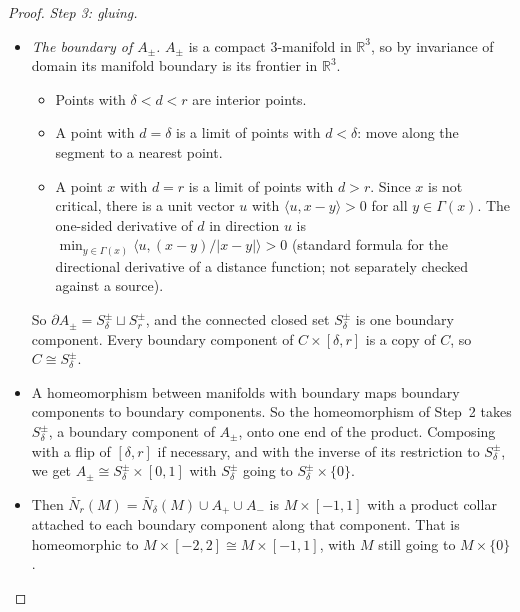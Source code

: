 \documentclass[preprint,12pt]{elsarticle}
\theoremstyle{definition}
\theoremstyle{remark}
\newcommand{\R}{\mathbb{R}}
\begin{document}
\begin{proof}
\emph{Step 3: gluing.}
\begin{itemize}
\item \emph{The boundary of $A_\pm$.} $A_\pm$ is a compact 3-manifold in $\R^3$, so by invariance of domain its manifold
boundary is its frontier in $\R^3$.
  \begin{itemize}
  \item Points with $\delta<d<r$ are interior points.
  \item A point with $d=\delta$ is a limit of points with $d<\delta$: move along the segment to a nearest point.
  \item A point $x$ with $d=r$ is a limit of points with $d>r$. Since $x$ is not critical, there is a unit vector $u$
  with $\langle u,x-y\rangle>0$ for all $y\in\Gamma(x)$. The one-sided derivative of $d$ in direction $u$ is
  $\min_{y\in\Gamma(x)}\langle u,(x-y)/|x-y|\rangle>0$ (standard formula for the directional derivative of a distance
  function; not separately checked against a source).
  \end{itemize}
  So $\partial A_\pm=S^\pm_\delta\sqcup S^\pm_r$, and the connected closed set $S^\pm_\delta$ is one boundary component.
  Every boundary component of $C\times[\delta,r]$ is a copy of $C$, so $C\cong S^\pm_\delta$.
\item A homeomorphism between manifolds with boundary maps boundary components to boundary components. So the
homeomorphism of Step~2 takes $S^\pm_\delta$, a boundary component of $A_\pm$, onto one end of the product. Composing
with a flip of $[\delta,r]$ if necessary, and with the inverse of its restriction to $S^\pm_\delta$, we get
$A_\pm\cong S^\pm_\delta\times[0,1]$ with $S^\pm_\delta$ going to $S^\pm_\delta\times\{0\}$.
\item Then $\bar N_r(M)=\bar N_\delta(M)\cup A_+\cup A_-$ is $M\times[-1,1]$ with a product collar attached to each
boundary component along that component. That is homeomorphic to $M\times[-2,2]\cong M\times[-1,1]$, with $M$ still
going to $M\times\{0\}$.
\end{itemize}


\end{proof}
\end{document}
